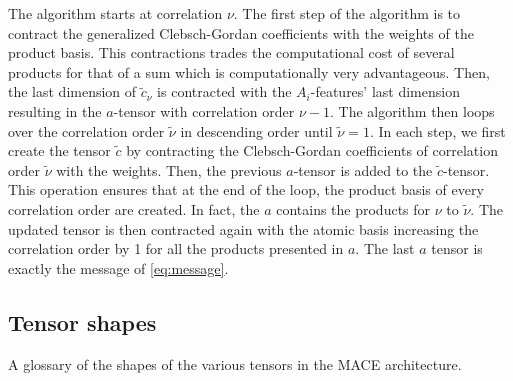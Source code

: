 \documentclass{article}
\begin{document}
%
The algorithm starts at correlation $\nu$.
The first step of the algorithm is to contract the generalized Clebsch-Gordan coefficients with the weights of the product basis.
This contractions trades the computational cost of several products for that of a sum which is computationally very advantageous.
Then, the last dimension of $\tilde{c}_{\nu}$ is contracted with the $A_{i}$-features' last dimension resulting in the $a$-tensor with correlation order $\nu - 1$.
The algorithm then loops over the correlation order $\tilde{\nu}$ in descending order until $\tilde{\nu} = 1$.
In each step, we first create the tensor $\tilde{c}$ by contracting the Clebsch-Gordan coefficients of correlation order $\tilde{\nu}$ with the weights.
Then, the previous $a$-tensor is added to the $\tilde{c}$-tensor.
This operation ensures that at the end of the loop,
the product basis of every correlation order are created.
In fact, the $a$ contains the products for $\nu$ to $\tilde{\nu}$.
The updated tensor is then contracted again with the atomic basis increasing the correlation order by 1 for all the products presented in $a$.
The last $a$ tensor is exactly the message of \eqref{eq:message}.

\subsection{Tensor shapes}
\label{sec:tensor_shapes}
A glossary of the shapes of the various tensors in the MACE architecture. 
\end{document}
